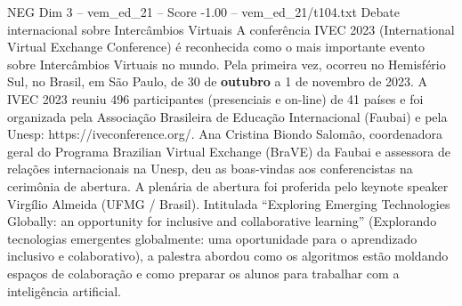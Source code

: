 \begin{textsample}{NEG Dim 3 – vem\_ed\_21 – Score -1.00 – vem\_ed\_21/t104.txt}  \label{ex:f3_neg_037}
Debate internacional sobre Intercâmbios Virtuais A conferência IVEC 2023 (International Virtual Exchange Conference) é reconhecida como o mais importante evento sobre Intercâmbios Virtuais no mundo.
Pela primeira vez, ocorreu no Hemisfério Sul, no Brasil, em São Paulo, de 30 de \textbf{outubro} a 1 de novembro de 2023.
A IVEC 2023 reuniu 496 participantes (presenciais e on-line) de 41 países e foi organizada pela Associação Brasileira de Educação Internacional (Faubai) e pela Unesp: https://iveconference.org/.
Ana Cristina Biondo Salomão, coordenadora geral do Programa Brazilian Virtual Exchange (BraVE) da Faubai e assessora de relações internacionais na Unesp, deu as boas-vindas aos conferencistas na cerimônia de abertura.
A plenária de abertura foi proferida pelo keynote speaker Virgílio Almeida (UFMG / Brasil).
Intitulada “Exploring Emerging Technologies Globally: an opportunity for inclusive and collaborative learning” (Explorando tecnologias emergentes globalmente: uma oportunidade para o aprendizado inclusivo e colaborativo), a palestra abordou como os algoritmos estão moldando espaços de colaboração e como preparar os alunos para trabalhar com a inteligência artificial.

\end{textsample}
